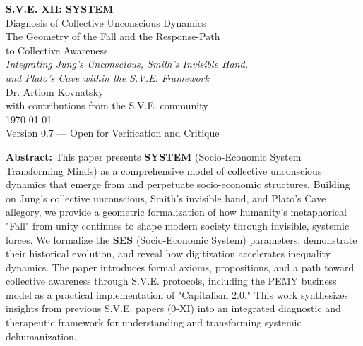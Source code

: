 \documentclass[11pt,a4paper]{article}
\newcommand{\SYSTEM}{\textbf{SYSTEM}}
\newcommand{\SES}{\textbf{SES}}
\theoremstyle{definition}
\theoremstyle{remark}
\begin{document}
\begin{titlepage}
\centering
\vspace*{1cm}

{\Huge\bfseries S.V.E. XII: \SYSTEM{}}\\[0.5cm]
{\Large Diagnosis of Collective Unconscious Dynamics}\\[0.3cm]
{\Large The Geometry of the Fall and the Response-Path}\\[0.3cm]
{\Large to Collective Awareness}\\[2cm]

{\large\textit{Integrating Jung's Unconscious, Smith's Invisible Hand,}\\[0.2cm]
\textit{and Plato's Cave within the S.V.E. Framework}}\\[3cm]

{\large Dr. Artiom Kovnatsky}\\[0.5cm]
{\normalsize with contributions from the S.V.E. community}\\[2cm]

{\large\today}\\[0.5cm]
{\normalsize Version 0.7 — Open for Verification and Critique}\\[1cm]

\vfill

\begin{mdframed}[backgroundcolor=gray!5]
\small
\textbf{Abstract:} This paper presents \SYSTEM{} (Socio-Economic System Transforming Minds) as a comprehensive model of collective unconscious dynamics that emerge from and perpetuate socio-economic structures. Building on Jung's collective unconscious, Smith's invisible hand, and Plato's Cave allegory, we provide a geometric formalization of how humanity's metaphorical "Fall" from unity continues to shape modern society through invisible, systemic forces. We formalize the \SES{} (Socio-Economic System) parameters, demonstrate their historical evolution, and reveal how digitization accelerates inequality dynamics. The paper introduces formal axioms, propositions, and a path toward collective awareness through S.V.E. protocols, including the PEMY business model as a practical implementation of "Capitalism 2.0." This work synthesizes insights from previous S.V.E. papers (0-XI) into an integrated diagnostic and therapeutic framework for understanding and transforming systemic dehumanization.
\end{mdframed}

\end{titlepage}
\end{document}
